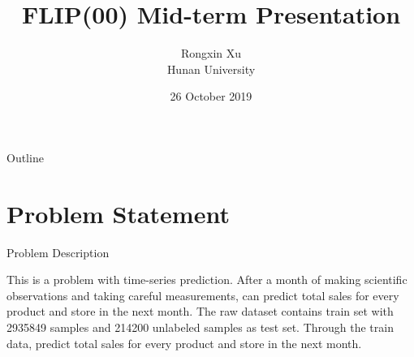 \documentclass[
 size=12pt,
 paper=smartboard, %
 mode=present, %
 display=slides, %
 style=tuliplab,  %
 pauseslide,
 fleqn,leqno,clock]{powerdot}
\title{FLIP(00) Mid-term Presentation}
\author{Rongxin Xu\\
Hunan University
}
\date{26 October 2019}
\begin{document}
\maketitle

\begin{slide}[toc=,bm=]{Outline}
  \tableofcontents[content=sections]
\end{slide}

\section{Problem Statement}

\begin{slide}{Problem Description}
	\begin{center}
		    This is a problem with time-series prediction.
			After a month of making scientific observations
			and taking careful measurements,
			can predict total sales for every product and store in the next 
			month.
			The raw dataset contains  train set with 2935849
				samples and 214200 unlabeled samples as test set.
			Through the train data, predict total sales for every 
			product and
				store in the next month.
	\end{center}
\end{slide}
\end{document}
